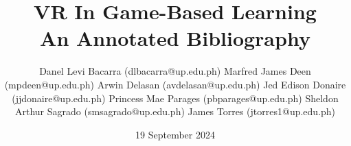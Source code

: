\documentclass[11pt]{article}
\title{VR In Game-Based Learning\\\medskip An Annotated Bibliography}
\author{
	Danel Levi Bacarra (dlbacarra@up.edu.ph)
	Marfred James Deen (mpdeen@up.edu.ph)
	Arwin Delasan (avdelasan@up.edu.ph)
	Jed Edison Donaire (jjdonaire@up.edu.ph)
	Princess Mae Parages (pbparages@up.edu.ph)
	Sheldon Arthur Sagrado (smsagrado@up.edu.ph)
	James Torres (jtorres1@up.edu.ph)
}
\date{19 September 2024}
\begin{document}
\maketitle
\nocite{*} %


\end{document}
